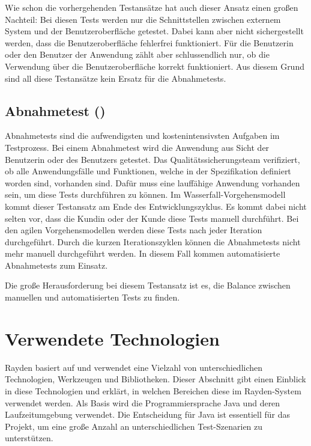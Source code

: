 \SuperPar
Wie schon die vorhergehenden Testansätze hat auch dieser Ansatz einen großen Nachteil: Bei diesen Tests werden nur die Schnittstellen zwischen externem System und der Benutzeroberfläche getestet. Dabei kann aber nicht sichergestellt werden, dass die Benutzeroberfläche fehlerfrei funktioniert. Für die Benutzerin oder den Benutzer der Anwendung zählt aber schlussendlich nur, ob die Verwendung über die Benutzeroberfläche korrekt funktioniert. Aus diesem Grund sind all diese Testansätze kein Ersatz für die Abnahmetests.

\subsection{Abnahmetest ()}

Abnahmetests sind die aufwendigsten und kostenintensivsten Aufgaben im Testprozess. Bei einem Abnahmetest wird die Anwendung aus Sicht der Benutzerin oder des Benutzers getestet. Das Qualitätssicherungsteam verifiziert, ob alle Anwendungsfälle und Funktionen, welche in der Spezifikation definiert worden sind, vorhanden sind. Dafür muss eine lauffähige Anwendung vorhanden sein, um diese Tests durchführen zu können. Im Wasserfall-Vorgehensmodell kommt dieser Testansatz am Ende des Entwicklungszyklus. Es kommt dabei nicht selten vor, dass die Kundin oder der Kunde diese Tests manuell durchführt. Bei den agilen Vorgehensmodellen werden diese Tests nach jeder Iteration durchgeführt. Durch die kurzen Iterationszyklen können die Abnahmetests nicht mehr manuell durchgeführt werden. In diesem Fall kommen automatisierte Abnahmetests zum Einsatz. 

\SuperPar
Die große Herausforderung bei diesem Testansatz ist es, die Balance zwischen manuellen und automatisierten Tests zu finden.

\section{Verwendete Technologien}

Rayden basiert auf und verwendet eine Vielzahl von unterschiedlichen Technologien, Werkzeugen und Bibliotheken. Dieser Abschnitt gibt einen Einblick in diese Technologien und erklärt, in welchen Bereichen diese im Rayden-System verwendet werden. Als Basis wird die Programmiersprache Java und deren Laufzeitumgebung verwendet. Die Entscheidung für Java ist essentiell für das Projekt, um eine große Anzahl an unterschiedlichen Test-Szenarien zu unterstützen. 

